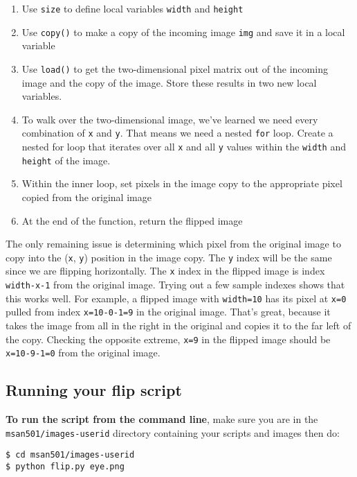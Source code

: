\documentclass[titlepage]{tufte-book}
\begin{document}
\begin{enumerate}
\item Use {\tt size} to define local variables {\tt width} and {\tt height}
\item Use {\tt copy()} to make a copy of the incoming image {\tt img} and save it in a local variable
\item Use {\tt load()} to get the two-dimensional pixel matrix out of the incoming image and the copy of the image. Store these results in two new local variables.
\item To walk over the two-dimensional image, we've learned we need every combination of {\tt x} and {\tt y}. That means we need a nested {\tt for} loop. Create a nested for loop that iterates over all {\tt x} and all {\tt y} values within the {\tt width} and {\tt height} of the image.
\item Within the inner loop, set pixels in the image copy to the appropriate pixel copied from the original image
\item At the end of the function, return the flipped image
\end{enumerate}

The only remaining issue is determining which pixel from the original image to copy into the ({\tt x}, {\tt y}) position in the image copy. The {\tt y} index will be the same since we are flipping horizontally. The {\tt x} index in the flipped image is index {\tt width-x-1} from the original image. Trying out a few sample indexes shows that this works well. For example, a flipped image with {\tt width=10} has its pixel at {\tt x=0} pulled from index {\tt x=10-0-1=9} in the original image. That's great, because it takes the image from all in the right in the original and copies it to the far left of the copy. Checking the opposite extreme, {\tt x=9} in the flipped image should be {\tt x=10-9-1=0} from the original image.

\subsection{Running your flip script}

{\bf To run the script from the command line}, make sure you are in the {\tt msan501/images-userid} directory containing your scripts and images then do:

\begin{lstlisting}[style=BashInputStyle]
$ cd msan501/images-userid
$ python flip.py eye.png
\end{lstlisting}
\end{document}
